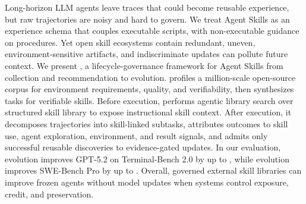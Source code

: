 Long-horizon LLM agents leave traces that could become reusable experience, but raw trajectories are noisy and hard to govern. We treat Agent Skills as an experience schema that couples executable scripts, with non-executable guidance on procedures. Yet open skill ecosystems contain redundant, uneven, environment-sensitive artifacts, and indiscriminate updates can pollute future context. We present \ours, a lifecycle-governance framework for Agent Skills from collection and recommendation to evolution. \ours profiles a million-scale open-source corpus for environment requirements, quality, and verifiability, then synthesizes tasks for verifiable skills. Before execution, \ours performs agentic library search over structured skill library to expose instructional skill context. After execution, it decomposes trajectories into skill-linked subtasks, attributes outcomes to skill use, agent exploration, environment, and result signals, and admits only successful reusable discoveries to evidence-gated updates. In our evaluation, \offline evolution improves GPT-5.2 on Terminal-Bench 2.0 by up to , while \online evolution improves SWE-Bench Pro by up to . Overall, governed external skill libraries can improve frozen agents without model updates when systems control exposure, credit, and preservation.
